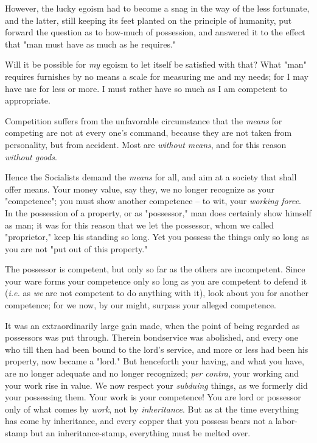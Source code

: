 \documentclass[a4paper]{book}
\begin{document}
However, the lucky egoism had to become a snag in the way of the less 
fortunate, and the latter, still keeping its feet planted on the principle of 
humanity, put forward the question as to how-much of possession, and answered 
it to the effect that "{}man must have as much as he requires."{}

Will it be possible for \textit{my} egoism to let itself be satisfied with 
that? What "{}man"{} requires furnishes by no means a scale for measuring me 
and my needs; for I may have use for less or more. I must rather have so much 
as I am competent to appropriate.

Competition suffers from the unfavorable circumstance that the \textit{means} 
for competing are not at every one's command, because they are not taken from 
personality, but from accident. Most are \textit{without means}, and for this 
reason \textit{without goods}.

Hence the Socialists demand the \textit{means} for all, and aim at a society 
that shall offer means. Your money value, say they, we no longer recognize as 
your "{}competence"{}; you must show another competence -- to wit, your 
\textit{working force}. In the possession of a property, or as 
"{}possessor,"{} man does certainly show himself as man; it was for this 
reason that we let the possessor, whom we called "{}proprietor,"{} keep his 
standing so long. Yet you possess the things only so long as you are not 
"{}put out of this property."{}

The possessor is competent, but only so far as the others are incompetent. 
Since your ware forms your competence only so long as you are competent to 
defend it (\textit{i.e.} as \textit{we} are not competent to do anything with 
it), look about you for another competence; for we now, by our might, surpass 
your alleged competence.

It was an extraordinarily large gain made, when the point of being regarded as 
possessors was put through. Therein bondservice was abolished, and every one 
who till then had been bound to the lord's service, and more or less had been 
his property, now became a "{}lord."{} But henceforth your having, and what 
you have, are no longer adequate and no longer recognized; \textit{per 
contra}, your working and your work rise in value. We now respect your 
\textit{subduing} things, as we formerly did your possessing them. Your work 
is your competence! You are lord or possessor only of what comes by 
\textit{work}, not by \textit{inheritance}. But as at the time everything has 
come by inheritance, and every copper that you possess bears not a labor-stamp 
but an inheritance-stamp, everything must be melted over.
\end{document}
